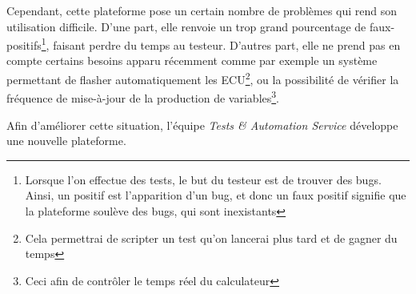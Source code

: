 			Cependant, cette plateforme pose un certain nombre de problèmes qui rend son utilisation difficile. D'une part, elle renvoie un trop grand pourcentage de faux-positifs\footnote{Lorsque l'on effectue des tests, le but du testeur est de trouver des bugs. Ainsi, un positif est l'apparition d'un bug, et donc un faux positif signifie que la plateforme soulève des bugs, qui sont inexistants}, faisant perdre du temps au testeur. D'autres part, elle ne prend pas en compte certains besoins apparu récemment comme par exemple un système permettant de flasher automatiquement les ECU\footnote{Cela permettrai de scripter un test qu'on lancerai plus tard et de gagner du temps}, ou la possibilité de vérifier la fréquence de mise-à-jour de la production de variables\footnote{Ceci afin de contrôler le temps réel du calculateur}.
			
			Afin d'améliorer cette situation, l'équipe \textit{Tests \& Automation Service} développe une nouvelle plateforme.
			
